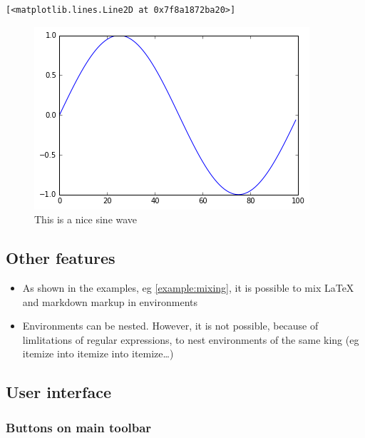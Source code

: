     

    
    
    
    \begin{verbatim}
[<matplotlib.lines.Line2D at 0x7f8a1872ba20>]
    \end{verbatim}

    

    
\begin{figure}[H]
\centering
\includegraphics[width=0.6\linewidth]{latex_env_doc_files/latex_env_doc_27_2.png}
\caption{This is a nice sine wave}
\label{fig:mysin}
\end{figure}
    
    \subsection{Other features}\label{other-features}

    \begin{itemize}
\tightlist
\item
  As shown in the examples, eg \ref{example:mixing}, it is possible to
  mix LaTeX and markdown markup in environments\\
\item
  Environments can be nested. However, it is not possible, because of
  limlitations of regular expressions, to nest environments of the same
  king (eg itemize into itemize into itemize\ldots{})
\end{itemize}

    \subsection{User interface}\label{user-interface}

    \subsubsection{Buttons on main toolbar}\label{buttons-on-main-toolbar}

